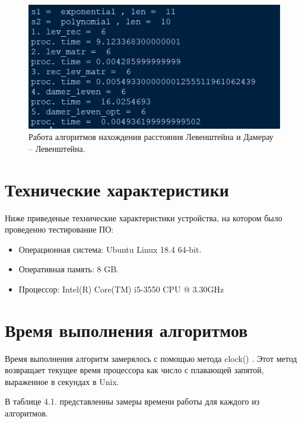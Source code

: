 \documentclass[12pt]{report}
\begin{document}
\begin{figure}[h]
	\begin{center}
	\includegraphics[scale=0.7]{example.jpg}
	 \caption{Работа алгоритмов нахождения расстояния Левенштейна и Дамерау -- Левенштейна.}
	\end{center}
\end{figure}

\section{Технические характеристики}

Ниже приведеные технические характеристики устройства, на котором было проведенно тестирование ПО:

\begin{itemize}

	\item Операционная система: Ubuntu Linux 18.4 64-bit.

	\item Оперативная память: 8 GB.

	\item Процессор: Intel(R) Core(TM) i5-3550 CPU @ 3.30GHz

\end{itemize}

\section{Время выполнения алгоритмов}
Время выполнения алгоритм замерялось с помощью метода clock() . Этот метод возвращает текущее время процессора как число с плавающей запятой, выраженное в секундах в Unix. \newline

В таблице 4.1. представленны замеры времени работы для каждого из алгоритмов.
\end{document}
